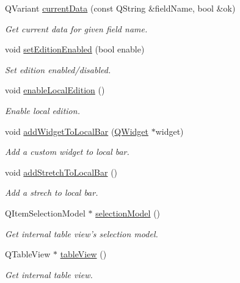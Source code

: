 \begin{DoxyCompactItemize}
Q\-Variant \hyperlink{classmdt_sql_table_widget_a02015aa0da93113547615cd951278042}{current\-Data} (const Q\-String \&field\-Name, bool \&ok)
\begin{DoxyCompactList}\small\item\em Get current data for given field name. \end{DoxyCompactList}\item 
void \hyperlink{classmdt_sql_table_widget_af5ef66b8ebb45a698f99ad455208f3c8}{set\-Edition\-Enabled} (bool enable)
\begin{DoxyCompactList}\small\item\em Set edition enabled/disabled. \end{DoxyCompactList}\item 
void \hyperlink{classmdt_sql_table_widget_a39422fb9522ee73513f13d8bcb91a143}{enable\-Local\-Edition} ()
\begin{DoxyCompactList}\small\item\em Enable local edition. \end{DoxyCompactList}\item 
void \hyperlink{classmdt_sql_table_widget_a9c0ae7b87d1840f2fdcee6de763fe31a}{add\-Widget\-To\-Local\-Bar} (\hyperlink{class_q_widget}{Q\-Widget} $\ast$widget)
\begin{DoxyCompactList}\small\item\em Add a custom widget to local bar. \end{DoxyCompactList}\item 
void \hyperlink{classmdt_sql_table_widget_a6cf9f08b98dd3df16d36c29db7175633}{add\-Stretch\-To\-Local\-Bar} ()
\begin{DoxyCompactList}\small\item\em Add a strech to local bar. \end{DoxyCompactList}\item 
Q\-Item\-Selection\-Model $\ast$ \hyperlink{classmdt_sql_table_widget_a47fc691f2cd9cc40749c987ce2bbea6d}{selection\-Model} ()
\begin{DoxyCompactList}\small\item\em Get internal table view's selection model. \end{DoxyCompactList}\item 
Q\-Table\-View $\ast$ \hyperlink{classmdt_sql_table_widget_af40eeb001ec262830daba6b311927ede}{table\-View} ()
\begin{DoxyCompactList}\small\item\em Get internal table view. \end{DoxyCompactList}\item 

\end{DoxyCompactItemize}
